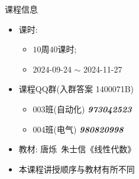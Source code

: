 \begin{frame}[<*>]{课程信息}
\begin{itemize}
	\item 课时:
		\begin{itemize}
			\item $10$周$40$课时;
			\item 2024-09-24 $\sim$ 2024-11-27
		\end{itemize}
	\item 课程QQ群(入群答案 1400071B)
		\begin{itemize}
			\item 003班(自动化) \emph{\textbf{973042523}}
			\item 004班(电气) \emph{\textbf{980820998}}
		\end{itemize}
	\item 教材: 唐烁\ 朱士信《线性代数》
	\item \alert{本课程讲授顺序与教材有所不同}
\end{itemize}
\end{frame}


